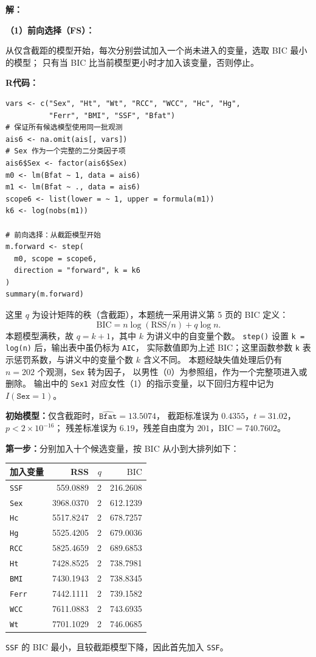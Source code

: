 \documentclass[12pt,a4paper]{article}
\begin{document}
\begin{answerbox}
\textbf{解：}

\textbf{（1）前向选择（FS）：}

从仅含截距的模型开始，每次分别尝试加入一个尚未进入的变量，选取 BIC 最小的模型；
只有当 BIC 比当前模型更小时才加入该变量，否则停止。

\textbf{R代码：}
\begin{lstlisting}[style=rcode]
vars <- c("Sex", "Ht", "Wt", "RCC", "WCC", "Hc", "Hg",
          "Ferr", "BMI", "SSF", "Bfat")
# 保证所有候选模型使用同一批观测
ais6 <- na.omit(ais[, vars])
# Sex 作为一个完整的二分类因子项
ais6$Sex <- factor(ais6$Sex)
m0 <- lm(Bfat ~ 1, data = ais6)
m1 <- lm(Bfat ~ ., data = ais6)
scope6 <- list(lower = ~ 1, upper = formula(m1))
k6 <- log(nobs(m1))

# 前向选择：从截距模型开始
m.forward <- step(
  m0, scope = scope6,
  direction = "forward", k = k6
)
summary(m.forward)
\end{lstlisting}

这里 $q$ 为设计矩阵的秩（含截距），本题统一采用讲义第 5 页的 BIC 定义：
$$
\mathrm{BIC}=n\log(\mathrm{RSS}/n)+q\log n.
$$
本题模型满秩，故 $q=k+1$，其中 $k$ 为讲义中的自变量个数。
\texttt{step()} 设置 \texttt{k = log(n)} 后，输出表中虽仍标为 \texttt{AIC}，
实际数值即为上述 BIC；这里函数参数 \texttt{k} 表示惩罚系数，与讲义中的变量个数 $k$ 含义不同。
本题经缺失值处理后仍有 $n=202$ 个观测，\texttt{Sex} 转为因子，
以男性（0）为参照组，作为一个完整项进入或删除。
输出中的 \texttt{Sex1} 对应女性（1）的指示变量，以下回归方程中记为 $I(\texttt{Sex}=1)$。

\textbf{初始模型：}仅含截距时，$\widehat{\texttt{Bfat}}=13.5074$，
截距标准误为 $0.4355$，$t=31.02$，$p<2\times10^{-16}$；
残差标准误为 $6.19$，残差自由度为 $201$，$\mathrm{BIC}=740.7602$。

\textbf{第一步：}分别加入十个候选变量，按 BIC 从小到大排列如下：

\begin{center}
\small
\begin{tabular}{lrrr}
\toprule
加入变量 & RSS & $q$ & $\mathrm{BIC}$ \\
\midrule
\texttt{SSF} & 559.0889 & 2 & 216.2608 \\
\texttt{Sex} & 3968.0370 & 2 & 612.1239 \\
\texttt{Hc} & 5517.8247 & 2 & 678.7257 \\
\texttt{Hg} & 5525.4205 & 2 & 679.0036 \\
\texttt{RCC} & 5825.4659 & 2 & 689.6853 \\
\texttt{Ht} & 7428.8525 & 2 & 738.7981 \\
\texttt{BMI} & 7430.1943 & 2 & 738.8345 \\
\texttt{Ferr} & 7442.1111 & 2 & 739.1582 \\
\texttt{WCC} & 7611.0883 & 2 & 743.6935 \\
\texttt{Wt} & 7701.1029 & 2 & 746.0685 \\
\bottomrule
\end{tabular}
\end{center}
\texttt{SSF} 的 BIC 最小，且较截距模型下降，因此首先加入 \texttt{SSF}。


\end{answerbox}
\end{document}
